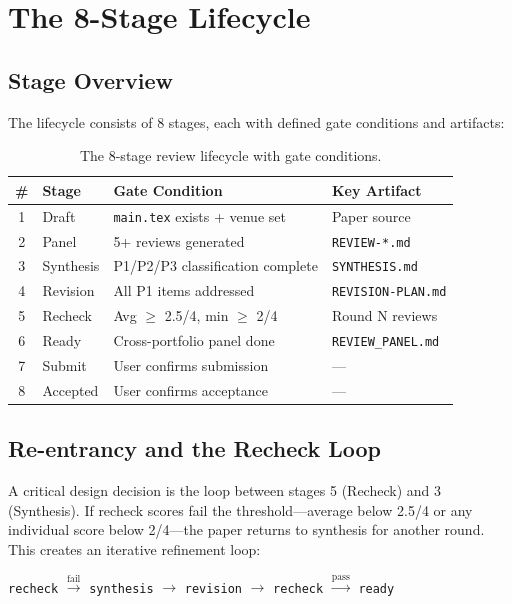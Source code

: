 \section{The 8-Stage Lifecycle}

\subsection{Stage Overview}

The lifecycle consists of 8 stages, each with defined gate conditions and artifacts:

\begin{table}[h]
\centering
\small
\begin{tabular}{clll}
\toprule
\# & Stage & Gate Condition & Key Artifact \\
\midrule
1 & Draft & \texttt{main.tex} exists + venue set & Paper source \\
2 & Panel & 5+ reviews generated & \texttt{REVIEW-*.md} \\
3 & Synthesis & P1/P2/P3 classification complete & \texttt{SYNTHESIS.md} \\
4 & Revision & All P1 items addressed & \texttt{REVISION-PLAN.md} \\
5 & Recheck & Avg $\geq$ 2.5/4, min $\geq$ 2/4 & Round N reviews \\
6 & Ready & Cross-portfolio panel done & \texttt{REVIEW\_PANEL.md} \\
7 & Submit & User confirms submission & --- \\
8 & Accepted & User confirms acceptance & --- \\
\bottomrule
\end{tabular}
\caption{The 8-stage review lifecycle with gate conditions.}
\end{table}

\subsection{Re-entrancy and the Recheck Loop}

A critical design decision is the loop between stages 5 (Recheck) and 3 (Synthesis). If recheck scores fail the threshold---average below 2.5/4 or any individual score below 2/4---the paper returns to synthesis for another round. This creates an iterative refinement loop:

\begin{center}
\texttt{recheck} $\xrightarrow{\text{fail}}$ \texttt{synthesis} $\to$ \texttt{revision} $\to$ \texttt{recheck} $\xrightarrow{\text{pass}}$ \texttt{ready}
\end{center}


